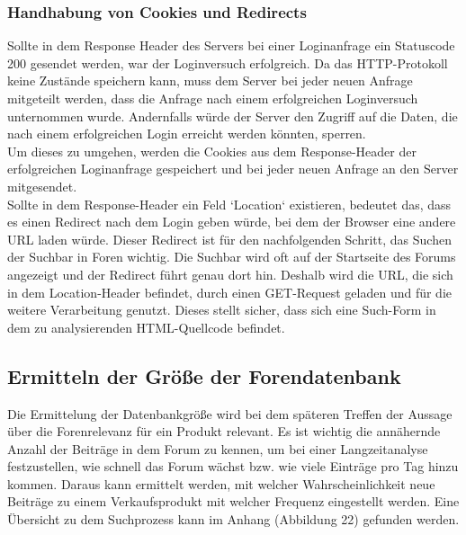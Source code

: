 \subsubsection{Handhabung von Cookies und Redirects}
Sollte in dem Response Header des Servers bei einer Loginanfrage ein Statuscode 200 gesendet werden, war der Loginversuch erfolgreich. Da das HTTP-Protokoll keine Zustände speichern kann, muss dem Server bei jeder neuen Anfrage mitgeteilt werden, dass die Anfrage nach einem erfolgreichen Loginversuch unternommen wurde. Andernfalls würde der Server den Zugriff auf die Daten, die nach einem erfolgreichen Login erreicht werden könnten, sperren.\\
Um dieses zu umgehen, werden die Cookies aus dem Response-Header der erfolgreichen Loginanfrage gespeichert und bei jeder neuen Anfrage an den Server mitgesendet.\\
Sollte in dem Response-Header ein Feld `Location` existieren, bedeutet das, dass es einen Redirect nach dem Login geben würde, bei dem der Browser eine andere URL laden würde. Dieser Redirect ist für den nachfolgenden Schritt, das Suchen der Suchbar in Foren wichtig. Die Suchbar wird oft auf der Startseite des Forums angezeigt und der Redirect führt genau dort hin. Deshalb wird die URL, die sich in dem Location-Header befindet, durch einen GET-Request geladen und für die weitere Verarbeitung genutzt. Dieses stellt sicher, dass sich eine Such-Form in dem zu analysierenden HTML-Quellcode befindet.


\subsection{Ermitteln der Größe der Forendatenbank}
Die Ermittelung der Datenbankgröße wird bei dem späteren Treffen der Aussage über die Forenrelevanz für ein Produkt relevant.
Es ist wichtig die annähernde Anzahl der Beiträge in dem Forum zu kennen, um bei einer Langzeitanalyse festzustellen, wie schnell das Forum wächst bzw. wie viele Einträge pro Tag hinzu kommen. Daraus kann ermittelt werden, mit welcher Wahrscheinlichkeit neue Beiträge zu einem Verkaufsprodukt mit welcher Frequenz eingestellt werden.
Eine Übersicht zu dem Suchprozess kann im Anhang (Abbildung 22) gefunden werden.\\
